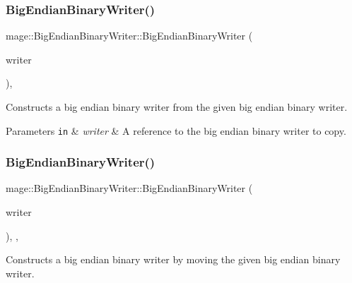 \subsubsection{\texorpdfstring{Big\+Endian\+Binary\+Writer()}{BigEndianBinaryWriter()}\hspace{0.1cm}{\footnotesize\ttfamily [2/3]}}
{\footnotesize\ttfamily mage\+::\+Big\+Endian\+Binary\+Writer\+::\+Big\+Endian\+Binary\+Writer (\begin{DoxyParamCaption}\item[{const \mbox{\hyperlink{classmage_1_1_big_endian_binary_writer}{Big\+Endian\+Binary\+Writer}} \&}]{writer }\end{DoxyParamCaption})\hspace{0.3cm}{\ttfamily [protected]}, {\ttfamily [delete]}}

Constructs a big endian binary writer from the given big endian binary writer.


\begin{DoxyParams}[1]{Parameters}
\mbox{\tt in}  & {\em writer} & A reference to the big endian binary writer to copy. \\
\hline
\end{DoxyParams}
\mbox{\label{classmage_1_1_big_endian_binary_writer_aaf2dcf536afefc7b0ca8b0752024311d}} 
\subsubsection{\texorpdfstring{Big\+Endian\+Binary\+Writer()}{BigEndianBinaryWriter()}\hspace{0.1cm}{\footnotesize\ttfamily [3/3]}}
{\footnotesize\ttfamily mage\+::\+Big\+Endian\+Binary\+Writer\+::\+Big\+Endian\+Binary\+Writer (\begin{DoxyParamCaption}\item[{\mbox{\hyperlink{classmage_1_1_big_endian_binary_writer}{Big\+Endian\+Binary\+Writer}} \&\&}]{writer }\end{DoxyParamCaption})\hspace{0.3cm}{\ttfamily [protected]}, {\ttfamily [default]}, {\ttfamily [noexcept]}}

Constructs a big endian binary writer by moving the given big endian binary writer.


